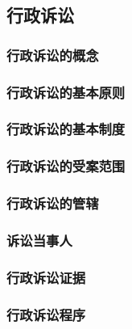 \subsection{行政诉讼}

\subsubsection{行政诉讼的概念}

\subsubsection{行政诉讼的基本原则}

\subsubsection{行政诉讼的基本制度}

\subsubsection{行政诉讼的受案范围}

\subsubsection{行政诉讼的管辖}

\subsubsection{诉讼当事人}

\subsubsection{行政诉讼证据}

\subsubsection{行政诉讼程序}
